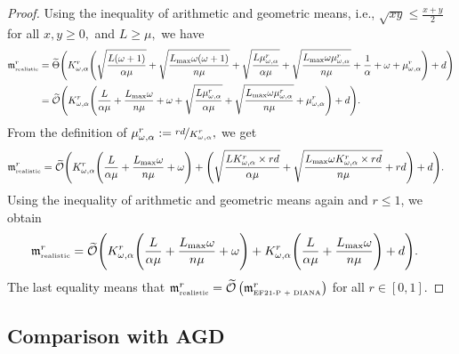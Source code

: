 \documentclass{article} %
\newcommand{\cO}{\mathcal{O}}
\theoremstyle{plain}
\theoremstyle{definition}
\theoremstyle{remark}
\newcommand{\eqdef}{:=}
\newcommand{\green}{\color{mydarkgreen}}
\newcommand{\algname}[1]{{\small\green\sf #1}}
\begin{document}
\begin{proof}
  Using the inequality of arithmetic and geometric means, i.e., $\sqrt{x y} \leq \frac{x + y}{2}$ for all $x, y \geq 0,$ and $L \geq \mu,$ we have
\begin{align*}
  \mathfrak{m}^{r}_{{\scriptscriptstyle \textnormal{realistic}}} &= \widetilde{\Theta}\Bigg(K_{\omega, \alpha}^r \Bigg(\sqrt{\frac{L (\omega + 1)}{\alpha \mu}} +  \sqrt{\frac{L_{\max} \omega (\omega + 1)}{n \mu}} + \sqrt{\frac{L \mu^r_{\omega, \alpha}}{\alpha \mu}} + \sqrt{\frac{L_{\max} \omega \mu^r_{\omega, \alpha}}{n \mu}} + \frac{1}{\alpha} + \omega + \mu^r_{\omega, \alpha}\Bigg) + d\Bigg)\\
  &= \widetilde{\cO}\Bigg(K_{\omega, \alpha}^r \Bigg(\frac{L}{\alpha \mu} + \frac{L_{\max} \omega}{n \mu} + \omega + \sqrt{\frac{L \mu^r_{\omega, \alpha}}{\alpha \mu}} + \sqrt{\frac{L_{\max} \omega \mu^r_{\omega, \alpha}}{n \mu}} + \mu^r_{\omega, \alpha}\Bigg) + d\Bigg).
\end{align*}
From the definition of $\mu^r_{\omega, \alpha} \eqdef \nicefrac{r d}{K_{\omega, \alpha}^r},$ we get
\begin{align*}
  \mathfrak{m}^{r}_{{\scriptscriptstyle \textnormal{realistic}}} = \widetilde{\cO}\Bigg(&K_{\omega, \alpha}^r \Bigg(\frac{L}{\alpha \mu} + \frac{L_{\max} \omega}{n \mu} + \omega\Bigg) + \Bigg(\sqrt{\frac{L K_{\omega, \alpha}^r \times r d}{\alpha \mu}} + \sqrt{\frac{L_{\max} \omega K_{\omega, \alpha}^r \times r d}{n \mu}} + rd\Bigg) + d\Bigg).
\end{align*}
Using the inequality of arithmetic and geometric means again and $r \leq 1$, we obtain
\begin{align*}
  \mathfrak{m}^{r}_{{\scriptscriptstyle \textnormal{realistic}}} = \widetilde{\cO}\Bigg(&K_{\omega, \alpha}^r \Bigg(\frac{L}{\alpha \mu} + \frac{L_{\max} \omega}{n \mu} + \omega\Bigg) + K_{\omega, \alpha}^r\Bigg(\frac{L}{\alpha \mu} + \frac{L_{\max} \omega}{n \mu}\Bigg) + d\Bigg).
\end{align*}
The last equality means that $\mathfrak{m}^{r}_{{\scriptscriptstyle \textnormal{realistic}}} = \widetilde{\cO}\left(\mathfrak{m}^{r}_{{\scriptscriptstyle \textnormal{EF21-P + DIANA}}}\right)$ for all $r \in [0, 1].$
\end{proof}

\subsection{Comparison with \algname{AGD}}
\end{document}
